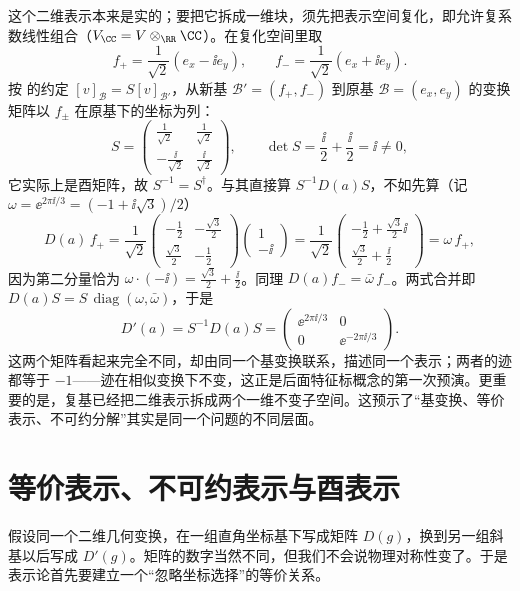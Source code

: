 这个二维表示本来是实的；要把它拆成一维块，须先把表示空间复化，即允许复系数线性组合（$V_{\CC}=V\otimes_{\RR}\CC$）。在复化空间里取
\[
f_+=\frac1{\sqrt2}(e_x-\ii e_y),\qquad
f_-=\frac1{\sqrt2}(e_x+\ii e_y).
\]
按  的约定 $[v]_{\mathcal B}=S[v]_{\mathcal B'}$，从新基 $\mathcal B'=(f_+,f_-)$ 到原基 $\mathcal B=(e_x,e_y)$ 的变换矩阵以 $f_\pm$ 在原基下的坐标为列：
\[
S=
\begin{pmatrix}
\tfrac{1}{\sqrt2} & \tfrac{1}{\sqrt2}\\[2pt]
-\tfrac{\ii}{\sqrt2} & \tfrac{\ii}{\sqrt2}
\end{pmatrix},
\qquad
\det S=\frac{\ii}{2}+\frac{\ii}{2}=\ii\neq0,
\]
它实际上是酉矩阵，故 $S^{-1}=S^\dagger$。与其直接算 $S^{-1}D(a)S$，不如先算（记 $\omega=\ee^{2\pi\ii/3}=(-1+\ii\sqrt3)/2$）
\[
D(a)\,f_+
=\frac1{\sqrt2}
\begin{pmatrix}
-\tfrac12&-\tfrac{\sqrt3}{2}\\[2pt]
\tfrac{\sqrt3}{2}&-\tfrac12
\end{pmatrix}
\begin{pmatrix}1\\-\ii\end{pmatrix}
=\frac1{\sqrt2}
\begin{pmatrix}-\tfrac12+\tfrac{\sqrt3}{2}\ii\\[2pt]\tfrac{\sqrt3}{2}+\tfrac{\ii}{2}\end{pmatrix}
=\omega\,f_+,
\]
因为第二分量恰为 $\omega\cdot(-\ii)=\tfrac{\sqrt3}{2}+\tfrac{\ii}{2}$。同理 $D(a)f_-=\bar\omega\,f_-$。两式合并即 $D(a)S=S\,\operatorname{diag}(\omega,\bar\omega)$，于是
\[
D'(a)=S^{-1}D(a)S=
\begin{pmatrix}
\ee^{2\pi\ii/3}&0\\
0&\ee^{-2\pi\ii/3}
\end{pmatrix}.
\]
这两个矩阵看起来完全不同，却由同一个基变换联系，描述同一个表示；两者的迹都等于 $-1$——迹在相似变换下不变，这正是后面特征标概念的第一次预演。更重要的是，复基已经把二维表示拆成两个一维不变子空间。这预示了“基变换、等价表示、不可约分解”其实是同一个问题的不同层面。

\section{等价表示、不可约表示与酉表示}
\label{sec:equiv-irreducible-unitary}


假设同一个二维几何变换，在一组直角坐标基下写成矩阵 $D(g)$，换到另一组斜基以后写成 $D'(g)$。矩阵的数字当然不同，但我们不会说物理对称性变了。于是表示论首先要建立一个“忽略坐标选择”的等价关系。

